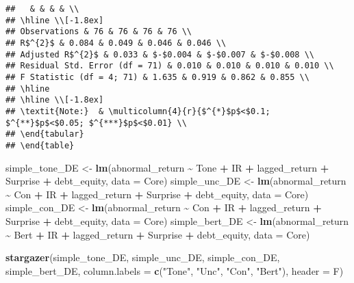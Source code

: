 \documentclass[
]{article}
\newenvironment{Shaded}{\begin{snugshade}}{\end{snugshade}}
\newcommand{\AttributeTok}[1]{\textcolor[rgb]{0.13,0.29,0.53}{#1}}
\newcommand{\FunctionTok}[1]{\textcolor[rgb]{0.13,0.29,0.53}{\textbf{#1}}}
\newcommand{\NormalTok}[1]{#1}
\newcommand{\OtherTok}[1]{\textcolor[rgb]{0.56,0.35,0.01}{#1}}
\newcommand{\SpecialCharTok}[1]{\textcolor[rgb]{0.81,0.36,0.00}{\textbf{#1}}}
\newcommand{\StringTok}[1]{\textcolor[rgb]{0.31,0.60,0.02}{#1}}
\begin{document}
\begin{verbatim}
##   & & & & \\ 
## \hline \\[-1.8ex] 
## Observations & 76 & 76 & 76 & 76 \\ 
## R$^{2}$ & 0.084 & 0.049 & 0.046 & 0.046 \\ 
## Adjusted R$^{2}$ & 0.033 & $-$0.004 & $-$0.007 & $-$0.008 \\ 
## Residual Std. Error (df = 71) & 0.010 & 0.010 & 0.010 & 0.010 \\ 
## F Statistic (df = 4; 71) & 1.635 & 0.919 & 0.862 & 0.855 \\ 
## \hline 
## \hline \\[-1.8ex] 
## \textit{Note:}  & \multicolumn{4}{r}{$^{*}$p$<$0.1; $^{**}$p$<$0.05; $^{***}$p$<$0.01} \\ 
## \end{tabular} 
## \end{table}
\end{verbatim}

\begin{Shaded}
\begin{Highlighting}[]
\NormalTok{simple\_tone\_DE }\OtherTok{\textless{}{-}} \FunctionTok{lm}\NormalTok{(abnormal\_return }\SpecialCharTok{\textasciitilde{}}\NormalTok{ Tone }\SpecialCharTok{+}\NormalTok{ IR }\SpecialCharTok{+}\NormalTok{ lagged\_return }\SpecialCharTok{+}\NormalTok{ Surprise }\SpecialCharTok{+}\NormalTok{ debt\_equity, }\AttributeTok{data =}\NormalTok{ Core)}
\NormalTok{simple\_unc\_DE }\OtherTok{\textless{}{-}} \FunctionTok{lm}\NormalTok{(abnormal\_return }\SpecialCharTok{\textasciitilde{}}\NormalTok{ Con }\SpecialCharTok{+}\NormalTok{ IR }\SpecialCharTok{+}\NormalTok{ lagged\_return }\SpecialCharTok{+}\NormalTok{ Surprise }\SpecialCharTok{+}\NormalTok{ debt\_equity, }\AttributeTok{data =}\NormalTok{ Core)}
\NormalTok{simple\_con\_DE }\OtherTok{\textless{}{-}} \FunctionTok{lm}\NormalTok{(abnormal\_return }\SpecialCharTok{\textasciitilde{}}\NormalTok{ Con }\SpecialCharTok{+}\NormalTok{ IR }\SpecialCharTok{+}\NormalTok{ lagged\_return }\SpecialCharTok{+}\NormalTok{ Surprise }\SpecialCharTok{+}\NormalTok{ debt\_equity, }\AttributeTok{data =}\NormalTok{ Core)}
\NormalTok{simple\_bert\_DE }\OtherTok{\textless{}{-}} \FunctionTok{lm}\NormalTok{(abnormal\_return }\SpecialCharTok{\textasciitilde{}}\NormalTok{ Bert }\SpecialCharTok{+}\NormalTok{ IR }\SpecialCharTok{+}\NormalTok{ lagged\_return }\SpecialCharTok{+}\NormalTok{ Surprise }\SpecialCharTok{+}\NormalTok{ debt\_equity, }\AttributeTok{data =}\NormalTok{ Core)}

\FunctionTok{stargazer}\NormalTok{(simple\_tone\_DE, simple\_unc\_DE, simple\_con\_DE, simple\_bert\_DE, }\AttributeTok{column.labels =} \FunctionTok{c}\NormalTok{(}\StringTok{"Tone"}\NormalTok{, }\StringTok{"Unc"}\NormalTok{, }\StringTok{"Con"}\NormalTok{, }\StringTok{"Bert"}\NormalTok{), }\AttributeTok{header =}\NormalTok{ F)}
\end{Highlighting}
\end{Shaded}
\end{document}

